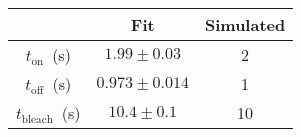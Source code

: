 \documentclass{article}
\renewcommand{\t}{\text}
\begin{document}
	\begin{tabular}{|c|c|c|}			
			\cline{2-3}
			\multicolumn{1}{c|}{}& Fit	&	Simulated	\\
			\cline{2-3}\hline
			$t_\t{on}$~(s)	&	$1.99\pm0.03$	&	2	\\
			$t_\t{off}$~(s) &	$0.973\pm0.014$	&	1\\
			$t_\t{bleach}$~(s) &	$10.4	\pm0.1$		&		10\\
			\hline
			
	\end{tabular}
\end{document}
